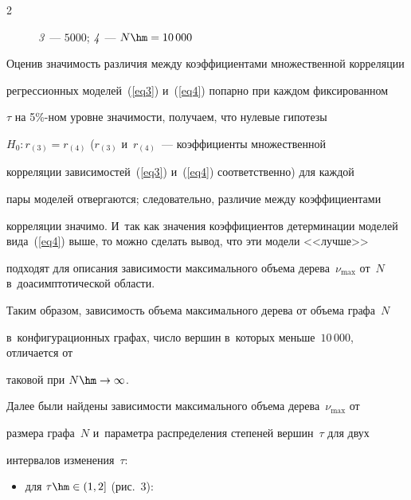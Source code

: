 \begin{multicols}{2}
\begin{figure}
\begin{minipage}[t]{80mm}
{\textit{3}~--- $5000$; \textit{4}~--- $N\hm=10\,000$}


\end{minipage}


\end{figure}











Оценив значимость различия между коэффициентами множественной корреляции 


регрессионных моделей~(\ref{eq3}) и~(\ref{eq4}) попарно при каждом фиксированном 


$\tau$ на 5\%-ном уровне значимости, получаем, что нулевые гипотезы 


$H_0:r_{(3)}=r_{(4)}$ ($r_{(3)}$ и~$r_{(4)}$~--- коэффициенты множественной 


корреляции зависимостей~(\ref{eq3}) и~(\ref{eq4}) соответственно) для каждой 


пары моделей отвергаются; следовательно, различие между коэффициентами 


корреляции значимо. И~так как значения коэффициентов детерминации моделей вида~(\ref{eq4}) выше, то можно сделать вывод, что эти модели <<лучше>> 


подходят для описания зависимости максимального объема дерева~$\nu_{\max}$ от~$N$ в~доасимптотической об\-ласти.


Таким образом, зависимость объема максимального дерева от объема графа~$N$ 


в~конфигурационных графах, число вершин в~которых меньше~$10\,000$, отличается от 


таковой при $N\hm\rightarrow\infty$.





Далее были найдены зависимости максимального объема дерева~$\nu_{\max}$ от 


размера графа~$N$ и~параметра распределения степеней вершин~$\tau$ для двух 


интервалов изменения~$\tau$:


\begin{itemize}


\item для $\tau\hm\in(1,2]$ (рис.~3):





\vspace*{-2pt}






\end{itemize}
\end{multicols}
